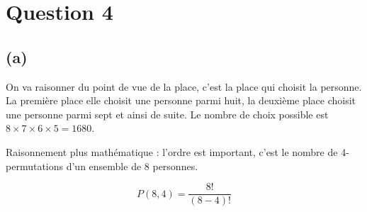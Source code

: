\section*{Question 4}
\setlength\parindent{17pt}
\subsection*{(a)}
On va raisonner du point de vue de la place, c’est la place qui choisit la personne. La première place elle choisit une personne parmi huit, la deuxième place choisit une personne parmi sept et ainsi de suite. Le nombre de choix possible est $ 8 \times 7 \times 6 \times 5 = 1680$.

Raisonnement plus mathématique : l’ordre est important, c’est le nombre de 4-permutations d’un ensemble de 8 personnes.

\[P(8,4) = \frac{8!}{(8-4)!}\]